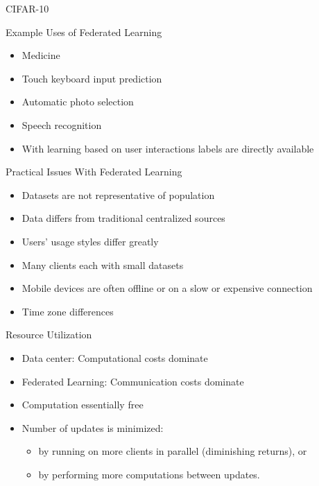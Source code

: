 \documentclass{beamer}{}
\begin{document}
    \begin{frame} {CIFAR-10}
    \end{frame}
    \begin{frame} {Example Uses of Federated Learning}
        \begin{itemize}[<+->]
            \item Medicine
            \item Touch keyboard input prediction
            \item Automatic photo selection
            \item Speech recognition
            \vspace{2em}
            \item With learning based on user interactions labels are directly available
        \end{itemize}
    \end{frame}
    \begin{frame} {Practical Issues With Federated Learning}
        \begin{itemize}[<+->]
            \item Datasets are not representative of population
            \item Data differs from traditional centralized sources
            \item Users' usage styles differ greatly
            \item Many clients each with small datasets
            \item Mobile devices are often offline or on a slow or expensive connection
            \item Time zone differences
        \end{itemize}
    \end{frame}
    \begin{frame} {Resource Utilization}
        \begin{itemize}[<+->]
            \item Data center: Computational costs dominate
            \item Federated Learning: Communication costs dominate
            \item Computation essentially free
            \item Number of updates is minimized:
            \begin{itemize}
                \item by running on more clients in parallel (diminishing returns), or
                \item by performing more computations between updates.
            \end{itemize}
        \end{itemize}
    \end{frame}
\end{document}
